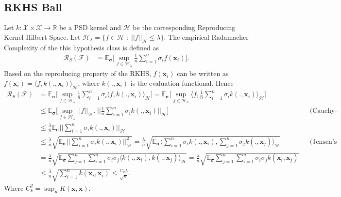 \documentclass[]{article}
\newcommand{\bx}{\mathbf{x}}
\newcommand{\bsigma}{{\boldsymbol{\sigma}}}
\newcommand{\cH}{\mathcal{H}}
\newcommand{\cF}{\mathcal{F}}
\newcommand{\Rad}{\mathcal{R}}
\newcommand{\cX}{\mathcal{X}}
\newcommand{\R}{\mathbb{R}}
\newcommand{\E}{\mathbb{E}}
\begin{document}
	\subsection{RKHS Ball}
	Let $k:\cX \times \cX \to \R$ be a PSD kernel and $\cH$ be the corresponding Reproducing Kernel Hilbert Space. Let $\cH_\lambda = \{f\in \cH \;:\; ||f||_\cH \leq \lambda\}$.
    The empirical Radamacher Complexity of the this hypothesis class is defined as
	\begin{align*}
	\Rad_S(\cF) &= \E_{\bsigma}\Big[\sup_{f \in \cH_\lambda} \frac{1}{n}\sum_{i = 1}^{n} \sigma_i f(\bx_i)\Big].
	\end{align*}
	Based on the reproducing property of the RKHS, $f(\bx_i)$ can be written as $ f(\bx_i) = \langle f, k(., \bx_i) \rangle_\cH$, where $k(., \bx_i)$ is the evaluation functional. Hence
	\begin{align*}
	\Rad_S(\cF) &= \E_{\bsigma}\Big[\sup_{f \in \cH_\lambda} \frac{1}{n}\sum_{i = 1}^{n} \sigma_i \langle f, k(., \bx_i)\rangle_\cH\Big]
	= \E_{\bsigma}\Big[\sup_{f \in \cH_\lambda}  \langle f, \frac{1}{n}\sum_{i = 1}^{n} \sigma_i k(., \bx_i)\rangle_\cH\Big]\\
	&\leq \E_{\bsigma}\Big[\sup_{f \in \cH_\lambda}  ||f||_\cH .\; \Big|\Big|\frac{1}{n}\sum_{i = 1}^{n} \sigma_i k(., \bx_i)\Big|\Big|_\cH\Big] && \text{(Cauchy-Schwartz)}\\
	&\leq \frac{\lambda}{n}\E_{\bsigma} \Big|\Big|\sum_{i = 1}^{n} \sigma_i k(., \bx_i)\Big|\Big|_\cH\\
	&\leq \frac{\lambda}{n}\sqrt{\E_{\bsigma}  \Big|\Big|\sum_{i = 1}^{n} \sigma_i k(., \bx_i)\Big|\Big|_\cH^2} = \frac{\lambda}{n}\sqrt{\E_{\bsigma}  \Big\langle\sum_{i = 1}^{n} \sigma_i k(., \bx_i), \sum_{j = 1}^{n} \sigma_j k(., \bx_j)\Big\rangle_\cH} && \text{(Jensen's Inequality)}\\
	&= \frac{\lambda}{n}\sqrt{\E_{\bsigma} \sum_{j = 1}^{n} \sum_{i = 1}^{n} \sigma_i \sigma_j\Big\langle k(., \bx_i), k(., \bx_j)\Big\rangle_\cH} =  \frac{\lambda}{n}\sqrt{\E_{\bsigma} \sum_{j = 1}^{n} \sum_{i = 1}^{n} \sigma_i \sigma_j k(\bx_i, \bx_j)} \\
	&\leq \frac{\lambda}{n} \sqrt{\sum_{i = 1}^{n}k(\bx_i, \bx_i)}	\leq
	 \frac{C_k\lambda}{\sqrt{n}}.
	\end{align*}
	Where $C_k^2 = \sup_{\bx} K(\bx, \bx)$.
	
\end{document}
